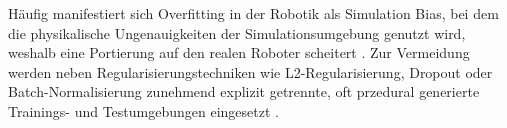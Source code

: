 Häufig manifestiert sich Overfitting in der Robotik als Simulation Bias, bei dem die physikalische Ungenauigkeiten der Simulationsumgebung genutzt wird, weshalb eine Portierung auf den realen Roboter scheitert \cite{Kober_IJRR_2013}. Zur Vermeidung werden neben Regularisierungstechniken wie L2-Regularisierung, Dropout oder Batch-Normalisierung zunehmend explizit getrennte, oft przedural generierte Trainings- und Testumgebungen eingesetzt \cite{cobbe2019quantifyinggeneralizationreinforcementlearning, kolomeytsevHybridMotionPlanning2025}.


